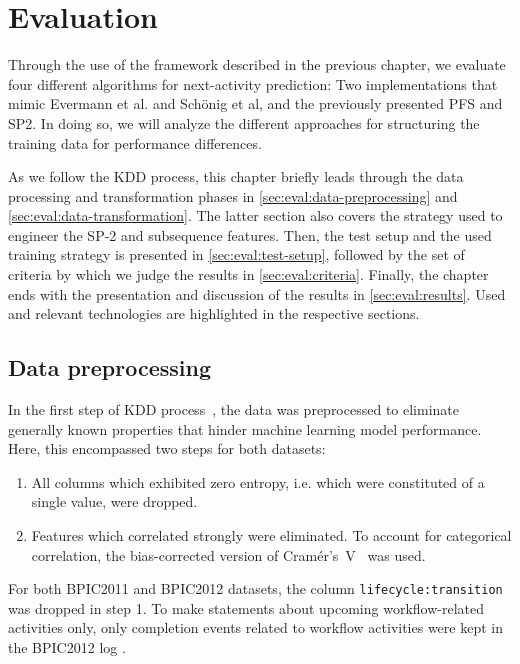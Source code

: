 \chapter{Evaluation}\label{chap:evaluation}
Through the use of the framework described in the previous chapter, we evaluate four different algorithms for next-activity prediction: Two implementations that mimic Evermann et al. and Schönig et al, and the previously presented PFS and SP2. In doing so, we will analyze the different approaches for structuring the training data for performance differences.

As we follow the KDD process, this chapter briefly leads through the data processing and transformation phases in \autoref{sec:eval:data-preprocessing} and \autoref{sec:eval:data-transformation}. The latter section also covers the strategy used to engineer the SP-2 and subsequence features. Then, the test setup and the used training strategy is presented in \autoref{sec:eval:test-setup}, followed by the set of criteria by which we judge the results in \autoref{sec:eval:criteria}. Finally, the chapter ends with the presentation and discussion of the results in \autoref{sec:eval:results}. Used and relevant technologies are highlighted in the respective sections.

\section{Data preprocessing}
\label{sec:eval:data-preprocessing}
In the first step of KDD process~\cite{fayyad1996data}, the data was preprocessed to eliminate generally known properties that hinder machine learning model performance. Here, this encompassed two steps for both datasets:

\begin{enumerate}
    \item All columns which exhibited zero entropy, i.e. which were constituted of a single value, were dropped.
    \item Features which correlated strongly were eliminated. To account for categorical correlation, the bias-corrected version of Cramér's~V~\cite{bergsma2013bias} was used.
\end{enumerate}


For both BPIC2011 and BPIC2012 datasets, the column \texttt{lifecycle:transition} was dropped in step 1. To make statements about upcoming workflow-related activities only, only completion events related to workflow activities were kept in the BPIC2012 log \cite{evermann2016}.

